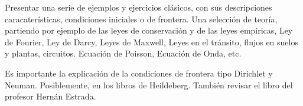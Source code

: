 Presentar una serie de ejemplos y ejercicios clásicos, con sus descripciones
caracaterísticas, condiciones iniciales o de frontera.  Una selección 
de teoría, partiendo por ejemplo de las leyes de conservación y de las 
leyes empíricas, Ley de Fourier, Ley de Darcy, Leyes de Maxwell, Leyes 
en el tránsito, flujos en suelos y plantas, circuitos.
Ecuación de Poisson, Ecuación de Onda, etc.

Es importante la explicación de la condiciones de frontera tipo Dirichlet y Neuman.
Posiblemente, en los libros de Heildeberg. También revisar el libro del profesor 
Hernán Estrada.